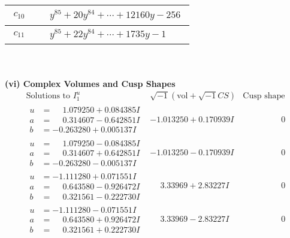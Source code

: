 \documentclass[1p]{elsarticle_modified}
\theoremstyle{definition}
\newcommand{\I}{\sqrt{-1}}
\begin{document}
\begin{tabular}{m{50pt}|m{274pt}}
\hline $$\begin{aligned}c_{10}\end{aligned}$$&$\begin{aligned}
&y^{85}+20 y^{84}+\cdots+12160 y-256
\end{aligned}$\\
\hline $$\begin{aligned}c_{11}\end{aligned}$$&$\begin{aligned}
&y^{85}+22 y^{84}+\cdots+1735 y-1
\end{aligned}$\\
\hline
\end{tabular}\\~\\
\newpage\flushleft \textbf{(vi) Complex Volumes and Cusp Shapes}
$$\begin{array}{c|c|c}  
\text{Solutions to }I^u_{1}& \I (\text{vol} + \sqrt{-1}CS) & \text{Cusp shape}\\
 \hline 
\begin{aligned}
u &= \phantom{-}1.079250 + 0.084385 I \\
a &= \phantom{-}0.314607 - 0.642851 I \\
b &= -0.263280 + 0.005137 I\end{aligned}
 & -1.013250 + 0.170939 I & \phantom{-0.000000 } 0 \\ \hline\begin{aligned}
u &= \phantom{-}1.079250 - 0.084385 I \\
a &= \phantom{-}0.314607 + 0.642851 I \\
b &= -0.263280 - 0.005137 I\end{aligned}
 & -1.013250 - 0.170939 I & \phantom{-0.000000 } 0 \\ \hline\begin{aligned}
u &= -1.111280 + 0.071551 I \\
a &= \phantom{-}0.643580 - 0.926472 I \\
b &= \phantom{-}0.321561 - 0.222730 I\end{aligned}
 & \phantom{-}3.33969 + 2.83227 I & \phantom{-0.000000 } 0 \\ \hline\begin{aligned}
u &= -1.111280 - 0.071551 I \\
a &= \phantom{-}0.643580 + 0.926472 I \\
b &= \phantom{-}0.321561 + 0.222730 I\end{aligned}
 & \phantom{-}3.33969 - 2.83227 I & \phantom{-0.000000 } 0 \\ \hline\begin{aligned}

\end{aligned}
\end{array}$$
\end{document}
